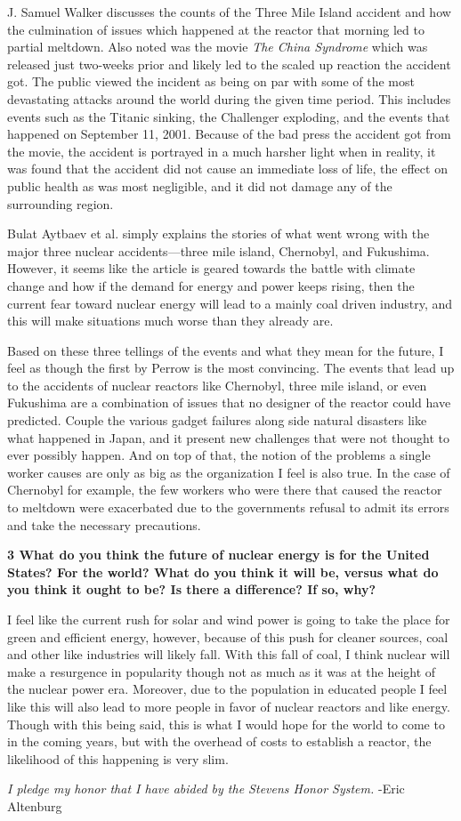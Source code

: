 \documentclass[12pt]{turabian-researchpaper}
\newcommand\question[2]{\noindent\textbf{#1 \quad #2}}
\begin{document}
	J. Samuel Walker discusses the counts of the Three Mile Island accident and how the culmination of issues which happened at the reactor that morning led to partial meltdown. Also noted was the movie \textit{The China Syndrome} which was released just two-weeks prior and likely led to the scaled up reaction the accident got. The public viewed the incident as being on par with some of the most devastating attacks around the world during the given time period. This includes events such as the Titanic sinking, the Challenger exploding, and the events that happened on September 11, 2001. Because of the bad press the accident got from the movie, the accident is portrayed in a much harsher light when in reality, it was found that the accident did not cause an immediate loss of life, the effect on public health as was most negligible, and it did not damage any of the surrounding region. 

	Bulat Aytbaev et al. simply explains the stories of what went wrong with the major three nuclear accidents—three mile island, Chernobyl, and Fukushima. However, it seems like the article is geared towards the battle with climate change and how if the demand for energy and power keeps rising, then the current fear toward nuclear energy will lead to a mainly coal driven industry, and this will make situations much worse than they already are.

	Based on these three tellings of the events and what they mean for the future, I feel as though the first by Perrow is the most convincing. The events that lead up to the accidents of nuclear reactors like Chernobyl, three mile island, or even Fukushima are a combination of issues that no designer of the reactor could have predicted. Couple the various gadget failures along side natural disasters like what happened in Japan, and it present new challenges that were not thought to ever possibly happen. And on top of that, the notion of the problems a single worker causes are only as big as the organization I feel is also true. In the case of Chernobyl for example, the few workers who were there that caused the reactor to meltdown were exacerbated due to the governments refusal to admit its errors and take the necessary precautions. 
	

\question{3}{What do you think the future of nuclear energy is for the United States? For the world? What do you think it will be, versus what do you think it ought to be? Is there a difference? If so, why?}

	I feel like the current rush for solar and wind power is going to take the place for green and efficient energy, however, because of this push for cleaner sources, coal and other like industries will likely fall. With this fall of coal, I think nuclear will make a resurgence in popularity though not as much as it was at the height of the nuclear power era. Moreover, due to the population in educated people I feel like this will also lead to more people in favor of nuclear reactors and like energy. Though with this being said, this is what I would hope for the world to come to in the coming years, but with the overhead of costs to establish a reactor, the likelihood of this happening is very slim. 


\vspace*{\fill}
\noindent\textit{I pledge my honor that I have abided by the Stevens Honor System.} -Eric Altenburg
\end{document}
